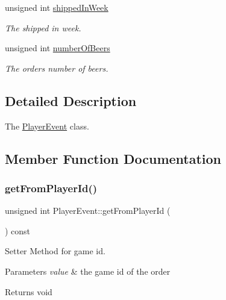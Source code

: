 \begin{DoxyCompactItemize}
\mbox{\label{classPlayerEvent_a893022c9784e236b67061cfe5e96ef45}} 
unsigned int \hyperlink{classPlayerEvent_a893022c9784e236b67061cfe5e96ef45}{shipped\+In\+Week}
\begin{DoxyCompactList}\small\item\em The shipped in week. \end{DoxyCompactList}\item 
\mbox{\label{classPlayerEvent_ad0148e813c51946a3c95efb3a09b1fe8}} 
unsigned int \hyperlink{classPlayerEvent_ad0148e813c51946a3c95efb3a09b1fe8}{number\+Of\+Beers}
\begin{DoxyCompactList}\small\item\em The order\textquotesingle{}s number of beers. \end{DoxyCompactList}\end{DoxyCompactItemize}


\subsection{Detailed Description}
The \hyperlink{classPlayerEvent}{Player\+Event} class. 

\subsection{Member Function Documentation}
\mbox{\label{classPlayerEvent_abc4c20973a6eafd4e9628c7264a1702d}} 
\subsubsection{\texorpdfstring{get\+From\+Player\+Id()}{getFromPlayerId()}}
{\footnotesize\ttfamily unsigned int Player\+Event\+::get\+From\+Player\+Id (\begin{DoxyParamCaption}{ }\end{DoxyParamCaption}) const}



Setter Method for game id. 


\begin{DoxyParams}{Parameters}
{\em value} & the game id of the order \\
\hline
\end{DoxyParams}
\begin{DoxyReturn}{Returns}
void 
\end{DoxyReturn}
\mbox{\label{classPlayerEvent_ab44a2b22c16007d332524231089a9cc1}} 
